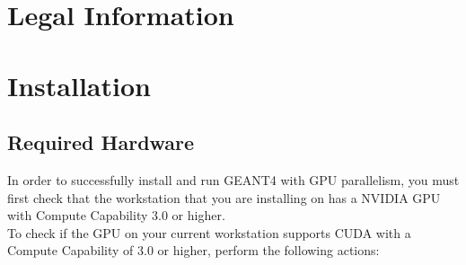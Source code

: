 \documentclass[12pt]{article}
\begin{document}
\section{Legal Information}	%

\section{Installation} %
\subsection{Required Hardware} %
In order to successfully install and run GEANT4 with GPU parallelism, you must first check that the workstation that you are installing on has a NVIDIA GPU with Compute Capability 3.0 or higher.\\
To check if the GPU on your current workstation supports CUDA with a Compute Capability of 3.0 or higher, perform the following actions:\\ \\
\end{document}
